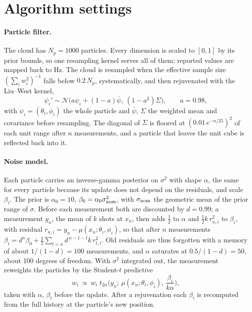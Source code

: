 \section{Algorithm settings}
\label{app:algorithm}

\paragraph{Particle filter.} The cloud has $N_p=1000$ particles. Every dimension is scaled to $[0,1]$ by its prior
bounds, so one resampling kernel serves all of them; reported values are mapped back to Hz. The cloud is resampled
when the effective sample size $(\sum_i w_i^2)^{-1}$ falls below $0.2\,N_p$, systematically, and then rejuvenated with
the Liu--West kernel,
\begin{equation}
  \psi_i'\sim\mathcal N\big(a\psi_i+(1-a)\bar\psi,\ (1-a^2)\Sigma\big),\qquad a=0.98,
  \label{eq:liuwest}
\end{equation}
with $\psi_i=(\theta_i,\phi_i)$ the whole particle and $\bar\psi$, $\Sigma$ the weighted mean and covariance before
resampling. The diagonal of $\Sigma$ is floored at $(0.01\,e^{-n/25})^2$ of each unit range after $n$ measurements,
and a particle that leaves the unit cube is reflected back into it.

\paragraph{Noise model.} Each particle carries an inverse-gamma posterior on $\sigma^2$ with shape $\alpha$, the same
for every particle because its update does not depend on the residuals, and scale $\beta_i$. The prior is
$\alpha_0=10$, $\beta_0=\alpha_0\sigma_{\rm nom}^2$, with $\sigma_{\rm nom}$ the geometric mean of the prior range of
$\sigma$. Before each measurement both are discounted by $d=0.99$; a measurement $y_n$, the mean of $k$ shots at
$x_n$, then adds $\tfrac12$ to $\alpha$ and $\tfrac12 k\,r_{n,i}^2$ to $\beta_i$, with residual
$r_{n,i}=y_n-\mu(x_n;\theta_i,\phi_i)$, so that after $n$ measurements
$\beta_i=d^n\beta_0+\tfrac12\sum_{t<n}d^{\,n-1-t}k\,r_{t,i}^2$. Old residuals are thus forgotten with a memory of
about $1/(1-d)=100$ measurements, and $\alpha$ saturates at $0.5/(1-d)=50$, about 100 degrees of freedom. With
$\sigma^2$ integrated out, the measurement reweights the particles by the Student-$t$ predictive
\begin{equation}
  w_i\ \propto\ w_i\;t_{2\alpha}\!\Big(y_n;\,\mu(x_n;\theta_i,\phi_i),\,\frac{\beta_i}{k\alpha}\Big),
  \label{eq:smc-update}
\end{equation}
taken with $\alpha$, $\beta_i$ before the update. After a rejuvenation each $\beta_i$ is recomputed from the full
history at the particle's new position.

